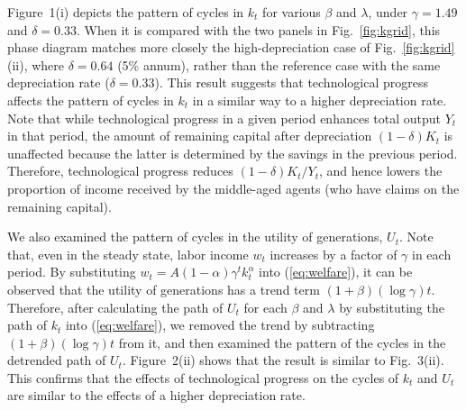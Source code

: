 \documentclass{MBE}%
\begin{document}
{Figure~1(i) depicts the pattern of cycles in $k_{t}$ for various $\beta$ and $\lambda$, under
$\gamma=1.49$ and $\delta=0.33$. When it is compared with the two panels in Fig.\ \ref{fig:kgrid},
this phase diagram matches more closely the high-depreciation case of Fig.\ \ref{fig:kgrid}(ii),
where $\delta=0.64$ (5\% annum), rather than the reference case with the same depreciation rate
($\delta=0.33$). This result suggests that technological progress affects the pattern of cycles in
$k_{t}$ in a similar way to a higher depreciation rate. Note that while technological progress in
a given period enhances total output $Y_{t}$ in that period, the amount of remaining capital after
depreciation $(1-\delta)K_{t}$ is unaffected because the latter is determined by the savings in
the previous period. Therefore, technological progress reduces $(1-\delta)K_{t}/Y_{t}$, and hence
lowers the proportion of income received by the middle-aged agents (who have claims on the
remaining capital).


We also examined the pattern of cycles in the utility of generations, $U_{t}$. Note that, even in
the steady state, labor income $w_{t}$ increases by a factor of $\gamma$ in each period. By
substituting $w_{t}=A(1-\alpha )\gamma^{t} k_{t}^{\alpha}$ into (\ref{eq:welfare}), it can be
observed that the utility of generations has a trend term $(1+\beta)(\log\gamma)t$. Therefore,
after calculating the path of $U_{t}$ for each $\beta$ and $\lambda$ by substituting the path of
$k_{t}$ into (\ref{eq:welfare}), we removed the trend by subtracting $(1+\beta)(\log\gamma)t$ from
it, and then examined the pattern of the cycles in the detrended path of $U_{t}$. Figure~2(ii)
shows that the result is similar to Fig.~3(ii). This confirms that the effects of technological
progress on the cycles of $k_{t}$ and $U_{t}$ are similar to the effects of a higher depreciation
rate.

}
\end{document}

